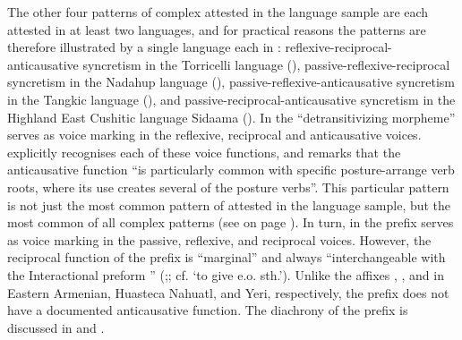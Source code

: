 The other four patterns of complex  attested in the language sample are each attested in at least two languages, and for practical reasons the patterns are therefore illustrated by a single language each in : reflexive-reciprocal-anticausative syncretism in the Torricelli language  (), pas\-sive-re\-flex\-ive-re\-ci\-proc\-al syncretism in the Nadahup language  (), pas\-sive-re\-flex\-ive-anti\-cau\-sative syncretism in the Tangkic language  (), and pas\-sive-re\-ci\-pro\-cal-anti\-cau\-sative syncretism in the Highland East Cushitic language Si\-daa\-ma (). In  the “detransitivizing morpheme”  serves as voice marking in the reflexive, reciprocal and anticausative voices. \citet[369f.]{wilson:2017} explicitly recognises each of these voice functions, and remarks that the anticausative function “is particularly common with specific posture-arrange  verb roots, where its use creates several of the posture verbs”. This particular pattern is not just the most common pattern of  attested in the language sample, but the most common of all complex patterns (see  on page \pageref{tab:ch6:voice-syncretism-maximal-complex-macroarea}). In turn, in  the prefix  serves as voice marking in the passive, reflexive, and reciprocal voices. However, the reciprocal function of the prefix is “marginal” and always “interchangeable with the Interactional preform ” (\citealt[473, 485f.]{epps:2008};; cf.  ‘to give e.o. sth.’). Unlike the affixes , , and  in Eastern Armenian, Huasteca Nahuatl, and Yeri, respectively, the  prefix  does not have a documented anticausative function. The diachrony of the prefix is discussed in  and .

